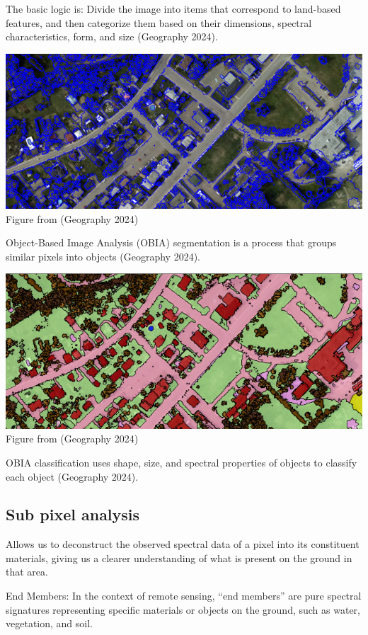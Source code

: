 \documentclass[
  letterpaper,
  DIV=11,
  numbers=noendperiod]{scrreprt}
\begin{document}
The basic logic is: Divide the image into items that correspond to
land-based features, and then categorize them based on their dimensions,
spectral characteristics, form, and size (Geography 2024).

\includegraphics{OBIA1.png} Figure from (Geography 2024)

Object-Based Image Analysis (OBIA) segmentation is a process that groups
similar pixels into objects (Geography 2024).

\includegraphics{OBIA2.png} Figure from (Geography 2024)

OBIA classification uses shape, size, and spectral properties of objects
to classify each object (Geography 2024).

\subsection{Sub pixel analysis}\label{sub-pixel-analysis}

Allows us to deconstruct the observed spectral data of a pixel into its
constituent materials, giving us a clearer understanding of what is
present on the ground in that area.

End Members: In the context of remote sensing, ``end members'' are pure
spectral signatures representing specific materials or objects on the
ground, such as water, vegetation, and soil.
\end{document}
